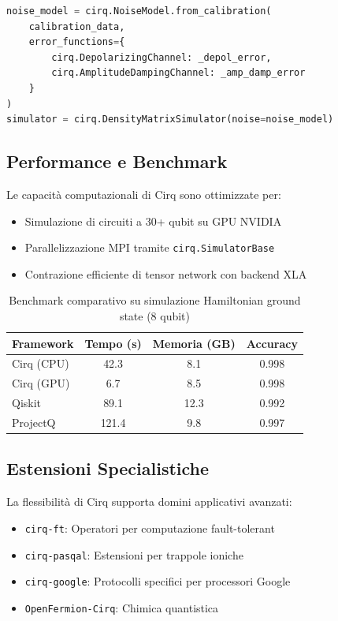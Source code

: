 \documentclass[a4paper,12pt]{report}
\theoremstyle{plain}
\begin{document}
\begin{lstlisting}[language=Python]
noise_model = cirq.NoiseModel.from_calibration(
    calibration_data, 
    error_functions={
        cirq.DepolarizingChannel: _depol_error,
        cirq.AmplitudeDampingChannel: _amp_damp_error
    }
)
simulator = cirq.DensityMatrixSimulator(noise=noise_model)
\end{lstlisting}

\subsection{Performance e Benchmark}
\label{subsec:cirq-bench}

Le capacità computazionali di Cirq sono ottimizzate per:
\begin{itemize}
    \item Simulazione di circuiti a 30+ qubit su GPU NVIDIA
    \item Parallelizzazione MPI tramite \texttt{cirq.SimulatorBase}
    \item Contrazione efficiente di tensor network con backend XLA
\end{itemize}

\begin{table}[h]
\centering
\caption{Benchmark comparativo su simulazione Hamiltonian ground state (8 qubit)}
\label{tab:cirq-benchmark}
\begin{tabular}{lccc}
\toprule
\textbf{Framework} & \textbf{Tempo (s)} & \textbf{Memoria (GB)} & \textbf{Accuracy} \\
\midrule
Cirq (CPU) & 42.3 & 8.1 & 0.998 \\
Cirq (GPU) & 6.7 & 8.5 & 0.998 \\
Qiskit & 89.1 & 12.3 & 0.992 \\
ProjectQ & 121.4 & 9.8 & 0.997 \\
\bottomrule
\end{tabular}
\end{table}

\subsection{Estensioni Specialistiche}
\label{subsec:cirq-extensions}

La flessibilità di Cirq supporta domini applicativi avanzati:
\begin{itemize}
    \item \texttt{cirq-ft}: Operatori per computazione fault-tolerant
    \item \texttt{cirq-pasqal}: Estensioni per trappole ioniche
    \item \texttt{cirq-google}: Protocolli specifici per processori Google
    \item \texttt{OpenFermion-Cirq}: Chimica quantistica
\end{itemize}
\end{document}
